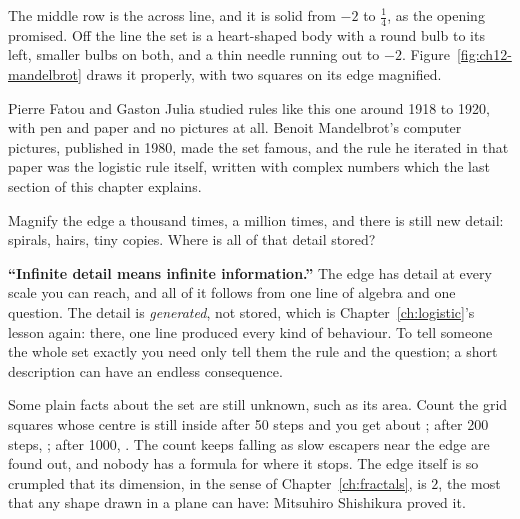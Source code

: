 \noindent\begin{minipage}{\linewidth}
\end{minipage}

\noindent
The middle row is the across line, and it is solid  from $-2$ to
$\tfrac14$, as the opening promised. Off the line the set is a heart-shaped
body with a round bulb to its left, smaller bulbs on both, and a thin
needle running out to $-2$. Figure~\ref{fig:ch12-mandelbrot} draws it
properly, with two squares on its edge magnified.


\noindent
Pierre Fatou and Gaston Julia studied rules like this one around 1918 to
1920, with pen and paper and no pictures at all. Benoit Mandelbrot's
computer pictures, published in 1980, made the set famous, and the rule he
iterated in that paper was the logistic rule itself, written with complex
numbers \dash{} which the last section of this chapter explains.

\begin{think}
Magnify the edge a thousand times, a million times, and there is still new
detail: spirals, hairs, tiny copies. Where is all of that detail stored?
\end{think}

\begin{trapbox}
\textbf{\enquote{Infinite detail means infinite information.}} The edge has
detail at every scale you can reach, and all of it follows from one line of
algebra and one question. The detail is \emph{generated}, not stored, which
is Chapter~\ref{ch:logistic}'s lesson again: there, one line produced every
kind of behaviour. To tell someone the whole set exactly you need only tell
them the rule and the question; a short description can have an endless
consequence.
\end{trapbox}

\noindent
Some plain facts about the set are still unknown, such as its area. Count
the grid squares whose centre is still inside after 50 steps and you get
about ; after 200 steps, ; after 1000,
. The count keeps falling as slow escapers near the edge
are found out, and nobody has a formula for where it stops. The edge itself
is so crumpled that its dimension, in the sense of
Chapter~\ref{ch:fractals}, is $2$, the most that any shape drawn in a plane
can have: Mitsuhiro Shishikura proved it.

